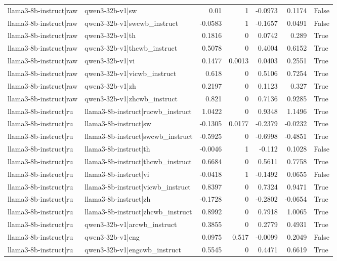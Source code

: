 \begin{table}
\begin{tabular}{l l r r r r l}
llama3-8b-instruct|raw & qwen3-32b-v1|sw & 0.01 & 1 & -0.0973 & 0.1174 & False \\
llama3-8b-instruct|raw & qwen3-32b-v1|swcwb_instruct & -0.0583 & 1 & -0.1657 & 0.0491 & False \\
llama3-8b-instruct|raw & qwen3-32b-v1|th & 0.1816 & 0 & 0.0742 & 0.289 & True \\
llama3-8b-instruct|raw & qwen3-32b-v1|thcwb_instruct & 0.5078 & 0 & 0.4004 & 0.6152 & True \\
llama3-8b-instruct|raw & qwen3-32b-v1|vi & 0.1477 & 0.0013 & 0.0403 & 0.2551 & True \\
llama3-8b-instruct|raw & qwen3-32b-v1|vicwb_instruct & 0.618 & 0 & 0.5106 & 0.7254 & True \\
llama3-8b-instruct|raw & qwen3-32b-v1|zh & 0.2197 & 0 & 0.1123 & 0.327 & True \\
llama3-8b-instruct|raw & qwen3-32b-v1|zhcwb_instruct & 0.821 & 0 & 0.7136 & 0.9285 & True \\
llama3-8b-instruct|ru & llama3-8b-instruct|rucwb_instruct & 1.0422 & 0 & 0.9348 & 1.1496 & True \\
llama3-8b-instruct|ru & llama3-8b-instruct|sw & -0.1305 & 0.0177 & -0.2379 & -0.0232 & True \\
llama3-8b-instruct|ru & llama3-8b-instruct|swcwb_instruct & -0.5925 & 0 & -0.6998 & -0.4851 & True \\
llama3-8b-instruct|ru & llama3-8b-instruct|th & -0.0046 & 1 & -0.112 & 0.1028 & False \\
llama3-8b-instruct|ru & llama3-8b-instruct|thcwb_instruct & 0.6684 & 0 & 0.5611 & 0.7758 & True \\
llama3-8b-instruct|ru & llama3-8b-instruct|vi & -0.0418 & 1 & -0.1492 & 0.0655 & False \\
llama3-8b-instruct|ru & llama3-8b-instruct|vicwb_instruct & 0.8397 & 0 & 0.7324 & 0.9471 & True \\
llama3-8b-instruct|ru & llama3-8b-instruct|zh & -0.1728 & 0 & -0.2802 & -0.0654 & True \\
llama3-8b-instruct|ru & llama3-8b-instruct|zhcwb_instruct & 0.8992 & 0 & 0.7918 & 1.0065 & True \\
llama3-8b-instruct|ru & qwen3-32b-v1|arcwb_instruct & 0.3855 & 0 & 0.2779 & 0.4931 & True \\
llama3-8b-instruct|ru & qwen3-32b-v1|eng & 0.0975 & 0.517 & -0.0099 & 0.2049 & False \\
llama3-8b-instruct|ru & qwen3-32b-v1|engcwb_instruct & 0.5545 & 0 & 0.4471 & 0.6619 & True \\

\end{tabular}
\end{table}
